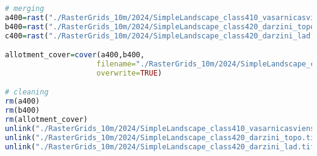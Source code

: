\documentclass[
]{book}
\begin{document}
\begin{lstlisting}[language=R]
# merging
a400=rast("./RasterGrids_10m/2024/SimpleLandscape_class410_vasarnicasviensetas_topo.tif")
b400=rast("./RasterGrids_10m/2024/SimpleLandscape_class420_darzini_topo.tif")
c400=rast("./RasterGrids_10m/2024/SimpleLandscape_class420_darzini_lad.tif")

allotment_cover=cover(a400,b400,
                     filename="./RasterGrids_10m/2024/SimpleLandscape_class400_varnicas_premask.tif",
                     overwrite=TRUE)

# cleaning
rm(a400)
rm(b400)
rm(allotment_cover)
unlink("./RasterGrids_10m/2024/SimpleLandscape_class410_vasarnicasviensetas_topo.tif")
unlink("./RasterGrids_10m/2024/SimpleLandscape_class420_darzini_topo.tif")
unlink("./RasterGrids_10m/2024/SimpleLandscape_class420_darzini_lad.tif")
\end{lstlisting}
\end{document}
